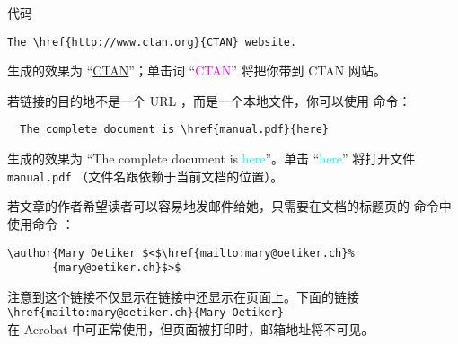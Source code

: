 代码
\begin{code}
\begin{verbatim}
The \href{http://www.ctan.org}{CTAN} website.
\end{verbatim}
\end{code}
生成的效果为 ``\href{http://www.ctan.org}{CTAN}''；单击词 ``\textcolor{magenta}{CTAN}'' 将把你带到 CTAN 网站。


若链接的目的地不是一个 URL ，而是一个本地文件，你可以使用  命令：
\begin{verbatim}
  The complete document is \href{manual.pdf}{here}
\end{verbatim}
生成的效果为 ``The complete document is
\textcolor{cyan}{here}''。单击 ``\textcolor{cyan}{here}'' 将打开文件 \texttt{manual.pdf}
（文件名跟依赖于当前文档的位置）。


若文章的作者希望读者可以容易地发邮件给她，只需要在文档的标题页的  命令中使用命令
 ：
\begin{code}
\begin{verbatim}
\author{Mary Oetiker $<$\href{mailto:mary@oetiker.ch}%
       {mary@oetiker.ch}$>$
\end{verbatim}
\end{code}
注意到这个链接不仅显示在链接中还显示在页面上。下面的链接\\
\verb+\href{mailto:mary@oetiker.ch}{Mary Oetiker}+ \\
在 Acrobat 中可正常使用，但页面被打印时，邮箱地址将不可见。


